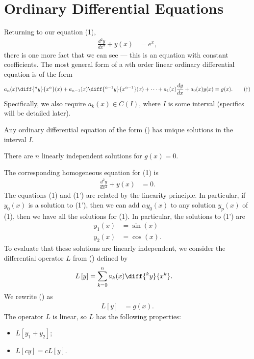 \documentclass[10pt]{mypackage}
\begin{document}
\section{Ordinary Differential Equations}%
Returning to our equation (1), 
\begin{align*}
  \frac{d^2y}{dx^2} + y(x) &= e^x,\tag*{(1)}
\end{align*}
there is one more fact that we can see --- this is an equation with constant coefficients. The most general form of a $n$th order linear ordinary differential equation is of the form
\begin{align*}
  a_n(x)\diff{^ny}{x^n}(x) + a_{n-1}(x)\diff{^{n-1}y}{x^{n-1}}(x) + \cdots + a_1(x)\frac{dy}{dx} + a_0(x)y(x) = g(x).\label{eq:general_linear_ode}\tag{\textdagger}
\end{align*}
Specifically, we also require $a_k(x)\in C(I)$, where $I$ is some interval (specifics will be detailed later).
\begin{theorem}
  Any ordinary differential equation of the form (\textdagger) has unique solutions in the interval $I$.\newline

  There are $n$ linearly independent solutions for $g(x) = 0$.
\end{theorem}
The corresponding homogeneous equation for (1) is
\begin{align*}
  \frac{d^2y}{dx^2} + y(x) &= 0.\tag*{(1')}
\end{align*}
The equations (1) and (1') are related by the linearity principle. In particular, if $y_0(x)$ is a solution to (1'), then we can add $\alpha y_0(x)$ to any solution $y_p(x)$ of (1), then we have all the solutions for (1). In particular, the solutions to (1') are
\begin{align*}
  y_1(x) &= \sin(x)\\
  y_2(x) &= \cos(x).
\end{align*}
To evaluate that these solutions are linearly independent, we consider the differential operator $L$ from (\textdagger) defined by
\begin{align*}
  L\left[y\right] &= \sum_{k=0}^{n}a_k(x)\diff{^{k}y}{x^{k}}.
\end{align*}
We rewrite (\textdagger) as
\begin{align*}
  L\left[y\right] &= g(x).
\end{align*}
The operator $L$ is linear, so $L$ has the following properties:
\begin{itemize}
  \item $L\left[y_1 + y_2\right]$;
  \item $L\left[cy\right] = cL\left[y\right]$.
\end{itemize}
\end{document}

